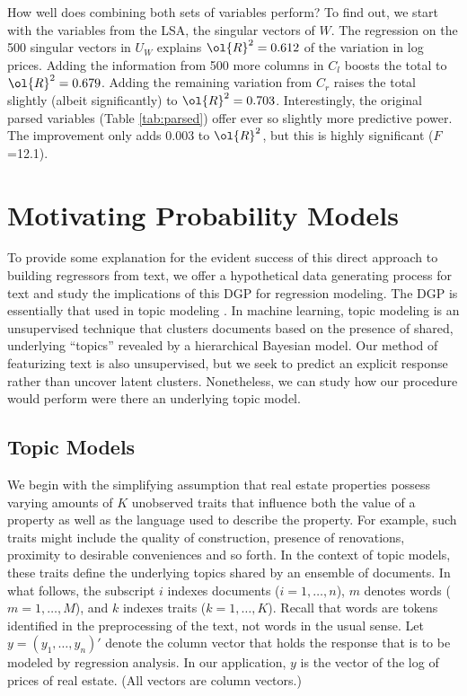 \documentclass[12pt]{article}
\begin{document}
How well does combining both sets of variables perform?  To find out, we start with the variables from the LSA, the singular vectors of $W$.   The regression on the 500 singular vectors in $U_W$ explains $\ol{R}^2 = 0.612$ of the variation in log prices.  Adding the information from 500 more columns in $C_l$ boosts the total to $\ol{R}^2 = 0.679$.  Adding the remaining variation from $C_r$ raises the total slightly (albeit significantly) to $\ol{R}^2 = 0.703$. Interestingly,  the original parsed variables (Table \ref{tab:parsed}) offer ever so slightly more predictive power. The improvement only adds 0.003 to $\ol{R}^2$, but this is highly significant ($F$=12.1).



\section{Motivating Probability Models}
\label{sec:model}

 To provide some explanation for the evident success of this direct approach to building regressors from text, we offer a hypothetical data generating process for text and study the implications of this DGP for regression modeling.  The DGP is essentially that used in topic modeling \citep{blei12}.  In machine learning, topic modeling is an unsupervised technique that  clusters documents based on the presence of shared, underlying ``topics'' revealed by a hierarchical Bayesian  model.  Our method of featurizing text is also unsupervised,  but we seek to predict an explicit response rather than uncover latent clusters.  Nonetheless, we can study how our procedure would perform were there an underlying topic model.


\subsection {Topic Models}  %

 We begin with the simplifying assumption that real estate properties possess
 varying amounts of $K$ unobserved traits that influence both the value of
 a property as well as the language used to describe the property.  For example,
 such traits might include the quality of construction, presence of renovations,
 proximity to desirable conveniences and so forth.  In the context of topic models, these traits define the underlying topics shared by an ensemble of documents.  In what follows, the subscript $i$ indexes documents ($i = 1,\ldots,n$), $m$ denotes words ($m=1,\ldots,M$), and $k$ indexes traits ($k = 1,\ldots,K$).  Recall that words are tokens identified in the preprocessing of the text, not words in the usual sense.   Let $y = (y_1,\ldots,y_n)'$ denote the column vector that holds the response that is to be modeled by regression analysis.    In our application, $y$ is the vector of the log of prices of real estate. (All vectors are column vectors.)
\end{document}
